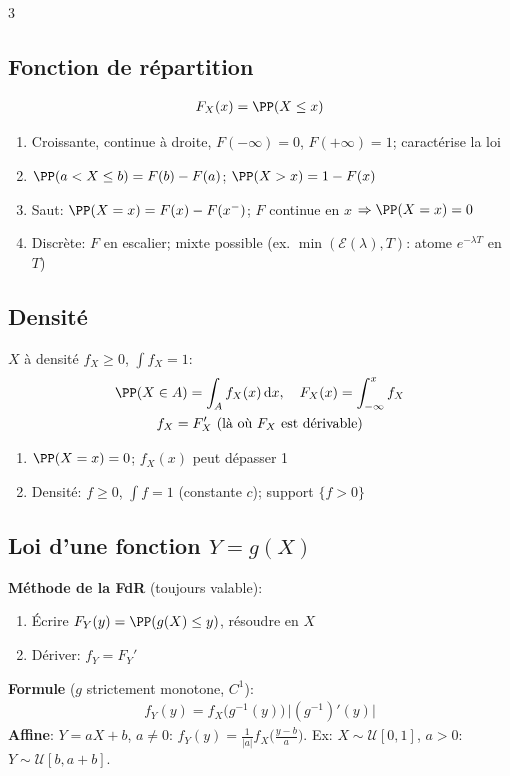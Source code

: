 \documentclass[12pt, a4paper]{article}
\newcommand{\dd}{\mathrm{d}}
\begin{document}
\begin{multicols*}{3}
	\subsection{Fonction de répartition}
	\begin{gather*}
		F_X(x)=\PP(X\leq x)
	\end{gather*}
	\begin{enumerate}[\roman*.]
		\item Croissante, continue à droite, $F(-\infty)=0$, $F(+\infty)=1$; caractérise la loi
		\item $\PP(a<X\leq b)=F(b)-F(a)$; $\PP(X>x)=1-F(x)$
		\item Saut: $\PP(X=x)=F(x)-F(x^-)$; $F$ continue en $x$ $\Rightarrow\PP(X=x)=0$
		\item Discrète: $F$ en escalier; mixte possible (ex. $\min(\mathcal E(\lambda),T)$: atome $e^{-\lambda T}$ en $T$)
	\end{enumerate}

	\subsection{Densité}
	$X$ à densité $f_X\geq0$, $\int f_X=1$:
	\begin{gather*}
		\PP(X\in A)=\int_Af_X(x)\,\dd x,\quad F_X(x)=\int_{-\infty}^xf_X\\
		f_X=F_X'\ \text{(là où $F_X$ est dérivable)}
	\end{gather*}
	\begin{enumerate}[\roman*.]
		\item $\PP(X=x)=0$; $f_X(x)$ peut dépasser 1
		\item Densité: $f\geq0$, $\int f=1$ (constante $c$); support $\{f>0\}$
	\end{enumerate}

	\subsection{Loi d'une fonction $Y=g(X)$}
	\textbf{Méthode de la FdR} (toujours valable):
	\begin{enumerate}[\roman*.]
		\item Écrire $F_Y(y)=\PP(g(X)\leq y)$, résoudre en $X$
		\item Dériver: $f_Y=F_Y'$
	\end{enumerate}
	\textbf{Formule} ($g$ strictement monotone, $C^1$):
	\begin{gather*}
		f_Y(y)=f_X\big(g^{-1}(y)\big)\,\big|(g^{-1})'(y)\big|
	\end{gather*}
	\textbf{Affine}: $Y=aX+b$, $a\neq0$: $f_Y(y)=\frac1{|a|}f_X\big(\frac{y-b}a\big)$. Ex: $X\sim\mathcal U[0,1]$, $a>0$: $Y\sim\mathcal U[b,a+b]$.


\end{multicols*}
\end{document}
